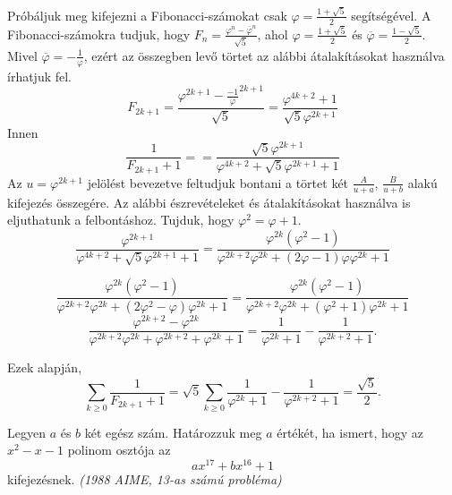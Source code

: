 \begin{solution}
Próbáljuk meg kifejezni a Fibonacci-számokat csak $\varphi=\frac{1+\sqrt{5}}{2}$
segítségével. A Fibonacci-számokra tudjuk, hogy $F_{n}=\frac{\varphi^{n}-\overline{\varphi}^{n}}{\sqrt{5}}$,
ahol $\varphi=\frac{1+\sqrt{5}}{2}$ és $\overline{\varphi}=\frac{1-\sqrt{5}}{2}$.
Mivel $\overline{\varphi}=-\frac{1}{\varphi}$, ezért az összegben
levő törtet az alábbi átalakításokat használva írhatjuk fel. 
\[
F_{2k+1}=\frac{\varphi^{2k+1}-\frac{-1}{\varphi}^{2k+1}}{\sqrt{5}}=\frac{\varphi^{4k+2}+1}{\sqrt{5}\varphi^{2k+1}}
\]
Innen 
\[
\frac{1}{F_{2k+1}+1}==\frac{\sqrt{5}\varphi^{2k+1}}{\varphi^{4k+2}+\sqrt{5}\varphi^{2k+1}+1}
\]
Az $u=\varphi^{2k+1}$ jelölést bevezetve feltudjuk bontani a törtet
két $\frac{A}{u+a}$, $\frac{B}{u+b}$ alakú kifejezés összegére.
Az alábbi észrevételeket és átalakításokat használva is eljuthatunk
a felbontáshoz. Tujduk, hogy $\varphi^{2}=\varphi+1$. 
\[
\frac{\varphi^{2k+1}}{\varphi^{4k+2}+\sqrt{5}\varphi^{2k+1}+1}=\frac{\varphi^{2k}(\varphi^{2}-1)}{\varphi^{2k+2}\varphi^{2k}+(2\varphi-1)\varphi\varphi^{2k}+1}
\]

\[
\frac{\varphi^{2k}(\varphi^{2}-1)}{\varphi^{2k+2}\varphi^{2k}+(2\varphi^{2}-\varphi)\varphi^{2k}+1}=\frac{\varphi^{2k}(\varphi^{2}-1)}{\varphi^{2k+2}\varphi^{2k}+(\varphi^{2}+1)\varphi^{2k}+1}
\]
\[
\frac{\varphi^{2k+2}-\varphi^{2k}}{\varphi^{2k+2}\varphi^{2k}+\varphi^{2k+2}+\varphi^{2k}+1}=\frac{1}{\varphi^{2k}+1}-\frac{1}{\varphi^{2k+2}+1}.
\]

Ezek alapján, 
\[
\sum_{k\geq0}\frac{1}{F_{2k+1}+1}=\sqrt{5}\sum_{k\geq0}\frac{1}{\varphi^{2k}+1}-\frac{1}{\varphi^{2k+2}+1}=\frac{\sqrt{5}}{2}.
\]
\end{solution}
\begin{extraproblem}
Legyen $a$ és $b$ két egész szám. Határozzuk meg $a$ értékét,
ha ismert, hogy az $x^{2}-x-1$ polinom osztója az 
\[
ax^{17}+bx^{16}+1
\]
kifejezésnek. \emph{(1988 AIME, 13-as számú probléma) }
\end{extraproblem}


